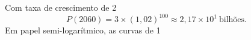 Com taxa de crescimento de 2%
\[
P(2060)=3\times(1{,}02)^{100}\approx2{,}17\times10^{1}\ \text{bilhões}.
\]
Em papel semi-logarítmico, as curvas de 1%